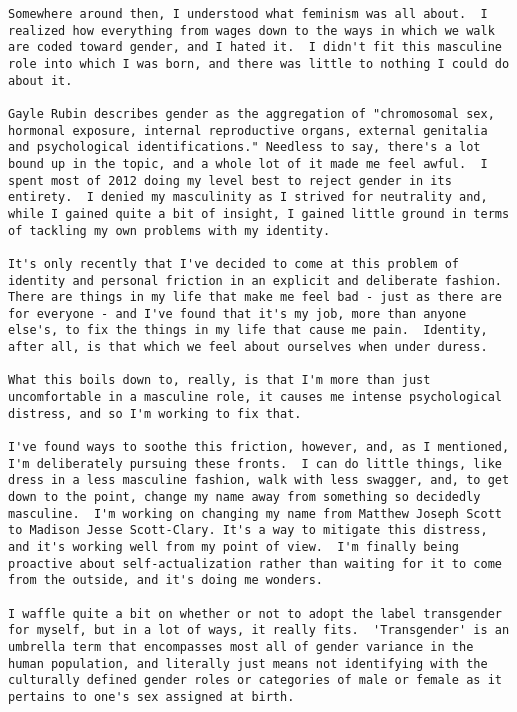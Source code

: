 \begin{paracol}{2}
\begin{leftcolumn}
\begin{verbatim}
Somewhere around then, I understood what feminism was all about.  I realized how everything from wages down to the ways in which we walk are coded toward gender, and I hated it.  I didn't fit this masculine role into which I was born, and there was little to nothing I could do about it.

Gayle Rubin describes gender as the aggregation of "chromosomal sex, hormonal exposure, internal reproductive organs, external genitalia and psychological identifications." Needless to say, there's a lot bound up in the topic, and a whole lot of it made me feel awful.  I spent most of 2012 doing my level best to reject gender in its entirety.  I denied my masculinity as I strived for neutrality and, while I gained quite a bit of insight, I gained little ground in terms of tackling my own problems with my identity.

It's only recently that I've decided to come at this problem of identity and personal friction in an explicit and deliberate fashion.  There are things in my life that make me feel bad - just as there are for everyone - and I've found that it's my job, more than anyone else's, to fix the things in my life that cause me pain.  Identity, after all, is that which we feel about ourselves when under duress.

What this boils down to, really, is that I'm more than just uncomfortable in a masculine role, it causes me intense psychological distress, and so I'm working to fix that.

I've found ways to soothe this friction, however, and, as I mentioned, I'm deliberately pursuing these fronts.  I can do little things, like dress in a less masculine fashion, walk with less swagger, and, to get down to the point, change my name away from something so decidedly masculine.  I'm working on changing my name from Matthew Joseph Scott to Madison Jesse Scott-Clary. It's a way to mitigate this distress, and it's working well from my point of view.  I'm finally being proactive about self-actualization rather than waiting for it to come from the outside, and it's doing me wonders.

I waffle quite a bit on whether or not to adopt the label transgender for myself, but in a lot of ways, it really fits.  'Transgender' is an umbrella term that encompasses most all of gender variance in the human population, and literally just means not identifying with the culturally defined gender roles or categories of male or female as it pertains to one's sex assigned at birth.


\end{verbatim}
\end{leftcolumn}
\end{paracol}
